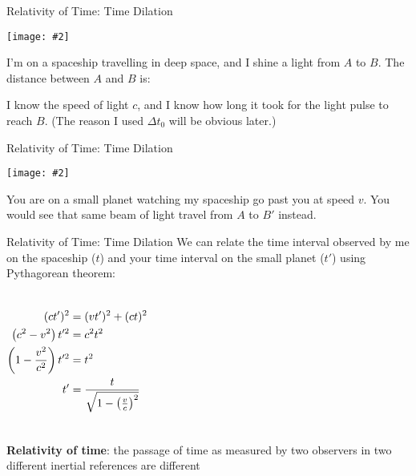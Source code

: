 \documentclass[12pt,compress,aspectratio=169]{beamer}
\newcommand{\pic}[2]{\texttt{[image: \#2]}}
\newcommand{\bigsqrt}{\ensuremath\sqrt{1-\left(\frac{v}{c}\right)^2}}
\newcommand{\eq}[2]{\vspace{#1}{\Large\begin{displaymath}#2\end{displaymath}}}
\begin{document}
\begin{frame}{Relativity of Time: Time Dilation}
  \begin{center}
    \pic{.25}{graphics/spaceship1}
  \end{center}
  \vspace{-.15in}I'm on a spaceship travelling in deep space, and I shine a
  light from $A$ to $B$. The distance between $A$ and $B$ is:

  \eq{-.3in}{
    |AB|=c\Delta t_0
  }

  \vspace{-.1in}I know the speed of light $c$, and I know how long it took for
  the light pulse to reach $B$. (The reason I used $\Delta t_0$ will be obvious
  later.)
\end{frame}


\begin{frame}{Relativity of Time: Time Dilation}
  \begin{center}
    \pic{.55}{graphics/spaceship2}
  \end{center}
  You are on a small planet watching my spaceship go past you at speed $v$. You
  would see that same beam of light travel from $A$ to $B'$ instead.
\end{frame}



\begin{frame}{Relativity of Time: Time Dilation}
  We can relate the time interval observed by me on the spaceship ($t$) and
  your time interval on the small planet ($t'$) using Pythagorean theorem:
  \begin{columns}
    
    \begin{align*}
      (ct')^2 &=(vt')^2 + (ct)^2\\
      \left(c^2-v^2\right)t'^2 &=c^2t^2\\
      \left(1-\frac{v^2}{c^2}\right)t'^2 &=t^2\\
      t' &=\frac{t}{\bigsqrt}
    \end{align*}
  \end{columns}
  \vspace{.1in}\textbf{Relativity of time}: the passage of time as measured by
  two observers in two different inertial references are different
\end{frame}
\end{document}
